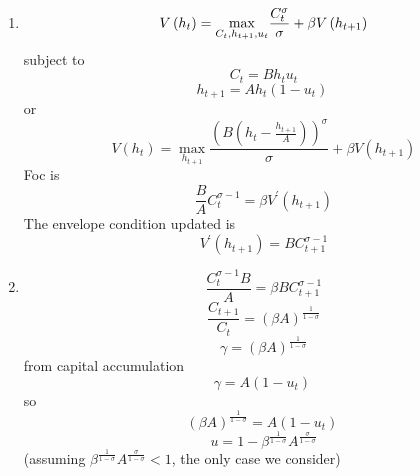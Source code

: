 \documentclass{article}
\begin{document}
\begin{enumerate}
\item 
\begin{equation*}
V\left( h_{t}\right) =\underset{C_{t},h_{t+1},u_{t}}{\max }\frac{%
C_{t}^{\sigma }}{\sigma }+\beta V\left( h_{t+1}\right)
\end{equation*}%
subject to 
\begin{equation*}
C_{t}=Bh_{t}u_{t}
\end{equation*}%
\begin{equation*}
h_{t+1}=Ah_{t}(1-u_{t})\ 
\end{equation*}%
or%
\begin{equation*}
V\left( h_{t}\right) =\underset{h_{t+1}}{\max }\frac{\left( B\left( h_{t}-%
\frac{h_{t+1}}{A}\right) \right) ^{\sigma }}{\sigma }+\beta V\left(
h_{t+1}\right)
\end{equation*}%
Foc is%
\begin{equation*}
\frac{B}{A}C_{t}^{\sigma -1}=\beta V^{\prime }\left( h_{t+1}\right)
\end{equation*}%
The envelope condition updated is%
\begin{equation*}
V^{\prime }\left( h_{t+1}\right) =BC_{t+1}^{\sigma -1}
\end{equation*}

\item 
\begin{equation*}
\frac{C_{t}^{\sigma -1}B}{A}=\beta BC_{t+1}^{\sigma -1}
\end{equation*}%
\begin{equation*}
\frac{C_{t+1}}{C_{t}}=\left( \beta A\right) ^{\frac{1}{1-\sigma }}
\end{equation*}%
\begin{equation*}
\gamma =\left( \beta A\right) ^{\frac{1}{1-\sigma }}
\end{equation*}%
from capital accumulation%
\begin{equation*}
\gamma =A(1-u_{t})\ 
\end{equation*}%
so%
\begin{equation*}
\left( \beta A\right) ^{\frac{1}{1-\sigma }}=A(1-u_{t})\ 
\end{equation*}%
\begin{equation*}
u=1-\beta ^{\frac{1}{1-\sigma }}A^{\frac{\sigma }{1-\sigma }}
\end{equation*}%
(assuming $\beta ^{\frac{1}{1-\sigma }}A^{\frac{\sigma }{1-\sigma }}<1$, the
only case we consider)


\end{enumerate}
\end{document}
